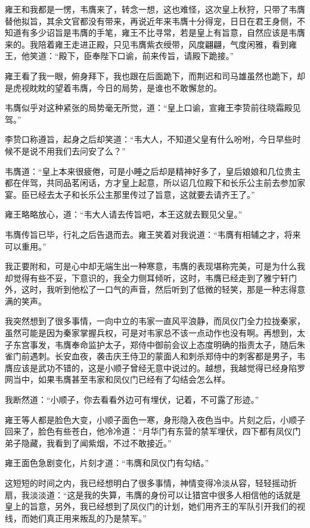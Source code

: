 雍王和我都是一愣，韦膺来了，转念一想，这也难怪，这次皇上秋狩，只带了韦膺替他拟旨，其余文官都没有带来，再说近年来韦膺十分得宠，日日在君王身侧，不知道有多少诏旨是韦膺的手笔，雍王不比寻常，若是皇上有旨意，自然应该是韦膺来的。我陪着雍王走进正殿，只见韦膺紫衣绶带，风度翩翩，气度闲雅，看到雍王，他笑道：“殿下，臣奉陛下口谕，前来传旨，请殿下跪接。”

雍王看了我一眼，俯身拜下，我也跟在后面跪下，而荆迟和司马雄虽然也跪下，却是虎视眈眈的望着韦膺，今日的局势，是谁也不敢懈怠的。

韦膺似乎对这种紧张的局势毫无所觉，道：“皇上口谕，宣雍王李贽前往晓霜殿见驾。”

李贽口称遵旨，起身之后却笑道：“韦大人，不知道父皇有什么吩咐，今日早些时候不是说不用我们去问安了么？”

韦膺道：“皇上本来很疲倦，可是小睡之后却是精神好多了，皇后娘娘和几位贵主都在伴驾，共同品茗闲话，方才皇上起意，所以诏几位殿下和长乐公主前去参加家宴。臣已经去太子和长乐公主那里传过了旨意，这就要去请齐王了。”

雍王略略放心，道：“韦大人请去传旨吧，本王这就去觐见父皇。”

韦膺传旨已毕，行礼之后告退而去。雍王笑着对我说道：“韦膺有相辅之才，将来可以重用。”

我正要附和，可是心中却无端生出一种寒意，韦膺的表现堪称完美，可是为什么我却觉得有些不妥，下意识的，我全力侧耳倾听，这时，韦膺已经走到了雅宁轩门外，这时，我听到他松了一口气的声音，然后听到了低微的轻笑，那是一种志得意满的笑声。

我突然想到了很多事情，一向中立的韦家一直风平浪静，而凤仪门全力拉拢秦家，虽然可能是因为秦家掌握兵权，可是对韦家总不该一点动作也没有啊。再想到，太子东宫事发，韦膺奉命监护太子，郑侍中御前会议上态度明确的指责太子，随后朱雀门前遇刺。长安血夜，袭击庆王侍卫的蒙面人和刺杀郑侍中的刺客都是男子，韦膺应该是武功不错的，这是小顺子曾经无意中说过的。越想，我越觉得已经身陷罗网当中，如果韦膺甚至韦家和凤仪门已经有了勾结会怎么样。

我断然道：“小顺子，你去看看外边可有埋伏，记着，不可露了形迹。”

雍王等人都是脸色大变，小顺子面色一寒，身形隐入夜色当中。片刻之后，小顺子回来了，脸色有些苍白，他冷冷道：“月华门有东营的禁军埋伏，四下都有凤仪门弟子隐藏，我看到了闻紫烟，不过不敢接近。”

雍王面色急剧变化，片刻才道：“韦膺和凤仪门有勾结。”

这短短的时间之内，我已经想明白了很多事情，神情变得冷淡从容，轻轻摇动折扇，我淡淡道：“这是我的失算，韦膺的身份可以让猎宫中很多人相信他的话就是皇上的旨意，另外，我已经想到了凤仪门的计划，她们用齐王的军队引开我们的视线，而她们真正用来叛乱的乃是禁军。”

